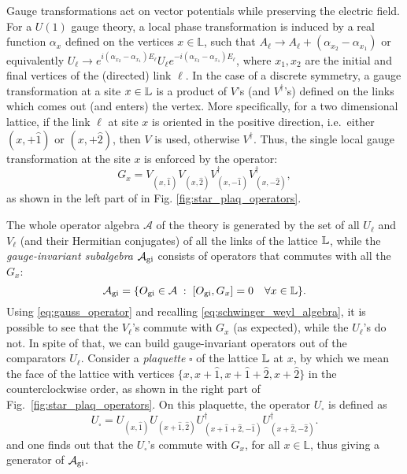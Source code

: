 Gauge transformations act on vector potentials while preserving the electric field.
For a $U(1)$ gauge theory, a local phase transformation is induced by a real function $\alpha_x$
defined on the vertices $x\in \mathbb L$, such that  $A_{\ell} \rightarrow A_{\ell} + (\alpha_{x_2} - \alpha_{x_1})$ or equivalently $U_{\ell} \rightarrow  e^{i(\alpha_{x_2} - \alpha_{x_1})
E_{\ell}}  U_{\ell}   e^{-i(\alpha_{x_2} - \alpha_{x_1} )E_{\ell}} $, where $x_1,x_2$ are the initial and final vertices of the (directed) link $\ell$.
In the case of a discrete symmetry, a gauge transformation at a site $x \in \mathbb{L}$ is a product of $V$'s (and $V^\dagger$'s) defined on the links which comes out (and enters) the vertex.
More specifically, for a two dimensional lattice,
if the link $\ell$ at site $x$ is oriented in the positive direction, i.e.~either $(x, +\hat{1})$ or $(x, +\hat{2})$, then $V$ is used, otherwise $V^\dagger$.
Thus,
the single local gauge transformation at the site $x$ is enforced by the operator:
\begin{equation}
    G_x =
    V_{(x, \hat{1})}^{\phantom{\dagger}}
    V_{(x, \hat{2})}^{\phantom{\dagger}}
    V^\dagger_{(x, -\hat{1})}
    V^\dagger_{(x, -\hat{2})},
    \label{eq:gauss_operator}
\end{equation}
as shown in the left part of in Fig. \ref{fig:star_plaq_operators}.

The whole operator algebra $\mathcal{A}$ of the theory is generated by the set of all $U_\ell$ and $V_\ell$ (and their Hermitian conjugates) of all the links of the lattice $\mathbb{L}$, while
the  \emph{gauge-invariant subalgebra} $\mathcal{A}_{\text{gi}}$ consists of operators that commutes with all the $G_x$:
\begin{equation}
    \mathcal{A}_{\text{gi}} = \{ O_{\text{gi}} \in \mathcal{A} \;:\; [O_{\text{gi}}, G_x] = 0 \quad \forall x \in \mathbb{L} \}.
\end{equation}
Using \eqref{eq:gauss_operator} and recalling \eqref{eq:schwinger_weyl_algebra}, it is possible to see that the $V_\ell$'s commute with $G_x$ (as expected), while the $U_\ell$'s do not.
In spite of that, we can build gauge-invariant operators out of the comparators $U_\ell$.
Consider a \emph{plaquette} $\square$ of the lattice $\mathbb{L}$ at $x$, by which we mean the face of the lattice with vertices $\{x, x+\hat{1}, x+\hat{1}+\hat{2}, x+\hat{2}\}$ in the counterclockwise order, as shown in the right part of Fig.~\ref{fig:star_plaq_operators}.
On this plaquette, the operator $U_{\square}$ is defined as
\begin{equation}
    U_{\square} =
    U_{(x, \hat{1})}
    U_{(x + \hat{1}, \hat{2})}
    U_{(x + \hat{1} + \hat{2}, -\hat{1})}^\dagger
    U_{(x + \hat{2}, -\hat{2})}^\dagger.
    \label{eq:plaq_operator}
\end{equation}
and one finds out that the $U_{\square}$'s commute with $G_x$, for all $x\in \mathbb L$, thus giving a generator of $\mathcal{A}_{\text{gi}}$.

